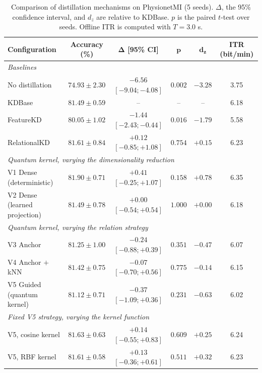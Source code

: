 \begin{table}[!htbp]
\centering
\caption{Comparison of distillation mechanisms on PhysionetMI (5 seeds).
$\Delta$, the 95\% confidence interval, and $d_z$ are relative to
KDBase. $p$ is the paired $t$-test over seeds. Offline ITR is computed
with $T = 3.0$ s.}
\label{tab:tongthe}
\footnotesize
\setlength{\tabcolsep}{4pt}
\begin{tabular}{lccccc}
\toprule
\textbf{Configuration} & \textbf{Accuracy (\%)} & $\boldsymbol{\Delta}$ \textbf{[95\% CI]} & $\boldsymbol{p}$ & $\boldsymbol{d_z}$ & \textbf{ITR (bit/min)} \\
\midrule
\multicolumn{6}{l}{\textit{Baselines}} \\
No distillation & $74.93 \pm 2.30$ & $-6.56$ $[-9.04; -4.08]$ & $0.002$ & $-3.28$ & 3.75 \\
KDBase & $81.49 \pm 0.59$ & -- & -- & -- & 6.18 \\
FeatureKD & $80.05 \pm 1.02$ & $-1.44$ $[-2.43; -0.44]$ & $0.016$ & $-1.79$ & 5.58 \\
RelationalKD & $81.61 \pm 0.84$ & $+0.12$ $[-0.85; +1.08]$ & $0.754$ & $+0.15$ & 6.23 \\
\midrule
\multicolumn{6}{l}{\textit{Quantum kernel, varying the dimensionality reduction}} \\
V1 Dense (deterministic) & $81.90 \pm 0.71$ & $+0.41$ $[-0.25; +1.07]$ & $0.158$ & $+0.78$ & 6.35 \\
V2 Dense (learned projection) & $81.49 \pm 0.78$ & $+0.00$ $[-0.54; +0.54]$ & $1.000$ & $+0.00$ & 6.18 \\
\midrule
\multicolumn{6}{l}{\textit{Quantum kernel, varying the relation strategy}} \\
V3 Anchor & $81.25 \pm 1.00$ & $-0.24$ $[-0.88; +0.39]$ & $0.351$ & $-0.47$ & 6.07 \\
V4 Anchor $+$ kNN & $81.42 \pm 0.75$ & $-0.07$ $[-0.70; +0.56]$ & $0.775$ & $-0.14$ & 6.15 \\
V5 Guided (quantum kernel) & $81.12 \pm 0.71$ & $-0.37$ $[-1.09; +0.36]$ & $0.231$ & $-0.63$ & 6.02 \\
\midrule
\multicolumn{6}{l}{\textit{Fixed V5 strategy, varying the kernel function}} \\
V5, cosine kernel & $81.63 \pm 0.63$ & $+0.14$ $[-0.55; +0.83]$ & $0.609$ & $+0.25$ & 6.24 \\
V5, RBF kernel & $81.61 \pm 0.58$ & $+0.13$ $[-0.36; +0.61]$ & $0.511$ & $+0.32$ & 6.23 \\
\bottomrule
\end{tabular}
\end{table}
\FloatBarrier

